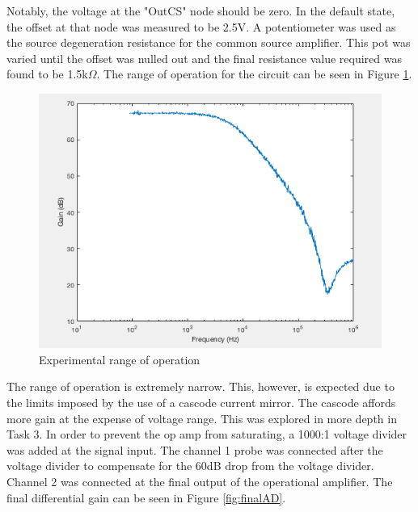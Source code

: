 Notably, the voltage at the "OutCS" node should be zero. In the default state, the offset at that node was measured to be 2.5V. A potentiometer was used as the source degeneration resistance for the common source amplifier. This pot was varied until the offset was nulled out and the final resistance value required was found to be 1.5k$\Omega$. The range of operation for the circuit can be seen in Figure \ref{fig:vtc}.


\begin{figure}[H]
	\begin{center}
		\includegraphics[scale=.40]{ExperimentalImplementation/Ad_final.png}
		\caption{Experimental range of operation}
		\label{fig:vtc}
	\end{center}
\end{figure}

The range of operation is extremely narrow. This, however, is expected due to the limits imposed by the use of a cascode current mirror. The cascode affords more gain at the expense of voltage range. This was explored in more depth in Task 3. In order to prevent the op amp from saturating, a 1000:1 voltage divider was added at the signal input. The channel 1 probe was connected after the voltage divider to compensate for the 60dB drop from the voltage divider. Channel 2 was connected at the final output of the operational amplifier. The final differential gain can be seen in Figure \ref{fig:finalAD}.

